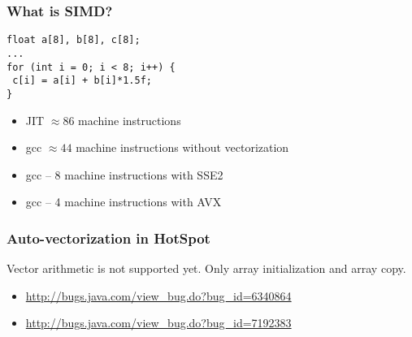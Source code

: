 \documentclass{beamer}
\begin{document}
  	\begin{frame}[fragile=singleslide]
    		\frametitle{What is SIMD?}
		\begin{verbatim}
float a[8], b[8], c[8];       
...
for (int i = 0; i < 8; i++) { 
 c[i] = a[i] + b[i]*1.5f;     
}
		\end{verbatim}
		\begin{itemize}
			\item JIT $\approx86$ machine instructions
			\item gcc $\approx44$ machine instructions without vectorization
			\item gcc -- 8 machine instructions with SSE2
			\item gcc -- 4 machine instructions with AVX
		\end{itemize}
  	\end{frame}  	
  	\begin{frame}
  		\frametitle{Auto-vectorization in HotSpot}
		Vector arithmetic is not supported yet. Only array initialization and array copy.
  		\begin{itemize}
  			\item \url{http://bugs.java.com/view_bug.do?bug_id=6340864}
  			\item \url{http://bugs.java.com/view_bug.do?bug_id=7192383}
  		\end{itemize}
  	\end{frame}
\end{document}
